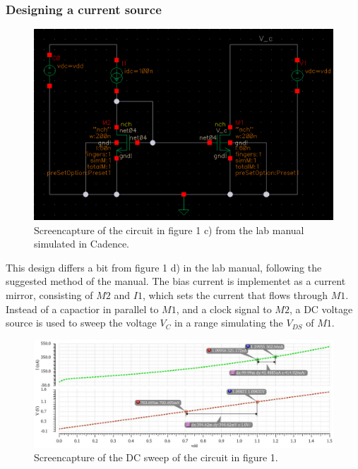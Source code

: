 \documentclass[onecolumn]{article}
\begin{document}
\subsubsection{Designing a current source}

\begin{figure}[h!]
    \centering
    \includegraphics[width=1\textwidth]{circuit_c_fixed.png}
    \caption{Screencapture of the circuit in figure 1 c) from the lab manual simulated in Cadence.}
    \label{fig:circuitc}
\end{figure}

\clearpage 

This design differs a bit from figure 1 d) in the lab manual, following the suggested method of the manual. The bias current is implementet as a current mirror, consisting of $M2$ and $I1$, which sets the current that flows through $M1$. Instead of a capactior in parallel to $M1$, and a clock signal to $M2$, a DC voltage source is used to sweep the voltage $V_C$ in a range simulating the $V_{DS}$ of $M1$. 



\begin{figure}[h!]
    \centering
    \includegraphics[width=1\textwidth]{plot_circuit_c_FINAL.png}
    \caption{Screencapture of the DC sweep of the circuit in figure 1.}
    \label{fig:plotc}
\end{figure}
\end{document}
